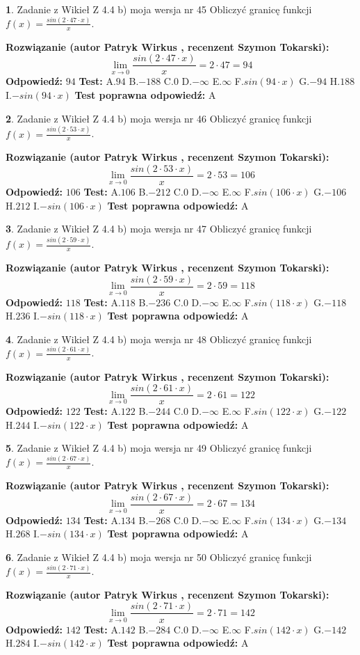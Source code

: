 \documentclass[12pt, a4paper]{article}
\theoremstyle{definition} %
\newtheorem{zad}{}
\newcommand{\zadStart}[1]{\begin{zad}#1\newline}
\newcommand{\zadStop}{\end{zad}}
\newcommand{\rozwStart}[2]{\noindent \textbf{Rozwiązanie (autor #1 , recenzent #2): }\newline}
\newcommand{\rozwStop}{\newline}
\newcommand{\odpStart}{\noindent \textbf{Odpowiedź:}\newline}
\newcommand{\odpStop}{\newline}
\newcommand{\testStart}{\noindent \textbf{Test:}\newline}
\newcommand{\testStop}{\newline}
\newcommand{\kluczStart}{\noindent \textbf{Test poprawna odpowiedź:}\newline}
\newcommand{\kluczStop}{\newline}
\begin{document}
\zadStart{Zadanie z Wikieł Z 4.4 b) moja wersja nr 45}
Obliczyć granicę funkcji $f(x)=\frac{sin(2 \cdot47\cdot x)}{x}$.
\zadStop
\rozwStart{Patryk Wirkus}{Szymon Tokarski}
$$\lim\limits_{x\to 0}\frac{sin(2 \cdot 47\cdot x)}{x}=
2 \cdot 47 = 94$$
\rozwStop
\odpStart
$94$
\odpStop
\testStart
A.$94$
B.$-188$
C.$0$
D.$-\infty$
E.$\infty$
F.$sin(94\cdot x)$
G.$-94$
H.$188$
I.$-sin(94\cdot x)$
\testStop
\kluczStart
A
\kluczStop



\zadStart{Zadanie z Wikieł Z 4.4 b) moja wersja nr 46}
Obliczyć granicę funkcji $f(x)=\frac{sin(2 \cdot53\cdot x)}{x}$.
\zadStop
\rozwStart{Patryk Wirkus}{Szymon Tokarski}
$$\lim\limits_{x\to 0}\frac{sin(2 \cdot 53\cdot x)}{x}=
2 \cdot 53 = 106$$
\rozwStop
\odpStart
$106$
\odpStop
\testStart
A.$106$
B.$-212$
C.$0$
D.$-\infty$
E.$\infty$
F.$sin(106\cdot x)$
G.$-106$
H.$212$
I.$-sin(106\cdot x)$
\testStop
\kluczStart
A
\kluczStop



\zadStart{Zadanie z Wikieł Z 4.4 b) moja wersja nr 47}
Obliczyć granicę funkcji $f(x)=\frac{sin(2 \cdot59\cdot x)}{x}$.
\zadStop
\rozwStart{Patryk Wirkus}{Szymon Tokarski}
$$\lim\limits_{x\to 0}\frac{sin(2 \cdot 59\cdot x)}{x}=
2 \cdot 59 = 118$$
\rozwStop
\odpStart
$118$
\odpStop
\testStart
A.$118$
B.$-236$
C.$0$
D.$-\infty$
E.$\infty$
F.$sin(118\cdot x)$
G.$-118$
H.$236$
I.$-sin(118\cdot x)$
\testStop
\kluczStart
A
\kluczStop



\zadStart{Zadanie z Wikieł Z 4.4 b) moja wersja nr 48}
Obliczyć granicę funkcji $f(x)=\frac{sin(2 \cdot61\cdot x)}{x}$.
\zadStop
\rozwStart{Patryk Wirkus}{Szymon Tokarski}
$$\lim\limits_{x\to 0}\frac{sin(2 \cdot 61\cdot x)}{x}=
2 \cdot 61 = 122$$
\rozwStop
\odpStart
$122$
\odpStop
\testStart
A.$122$
B.$-244$
C.$0$
D.$-\infty$
E.$\infty$
F.$sin(122\cdot x)$
G.$-122$
H.$244$
I.$-sin(122\cdot x)$
\testStop
\kluczStart
A
\kluczStop



\zadStart{Zadanie z Wikieł Z 4.4 b) moja wersja nr 49}
Obliczyć granicę funkcji $f(x)=\frac{sin(2 \cdot67\cdot x)}{x}$.
\zadStop
\rozwStart{Patryk Wirkus}{Szymon Tokarski}
$$\lim\limits_{x\to 0}\frac{sin(2 \cdot 67\cdot x)}{x}=
2 \cdot 67 = 134$$
\rozwStop
\odpStart
$134$
\odpStop
\testStart
A.$134$
B.$-268$
C.$0$
D.$-\infty$
E.$\infty$
F.$sin(134\cdot x)$
G.$-134$
H.$268$
I.$-sin(134\cdot x)$
\testStop
\kluczStart
A
\kluczStop



\zadStart{Zadanie z Wikieł Z 4.4 b) moja wersja nr 50}
Obliczyć granicę funkcji $f(x)=\frac{sin(2 \cdot71\cdot x)}{x}$.
\zadStop
\rozwStart{Patryk Wirkus}{Szymon Tokarski}
$$\lim\limits_{x\to 0}\frac{sin(2 \cdot 71\cdot x)}{x}=
2 \cdot 71 = 142$$
\rozwStop
\odpStart
$142$
\odpStop
\testStart
A.$142$
B.$-284$
C.$0$
D.$-\infty$
E.$\infty$
F.$sin(142\cdot x)$
G.$-142$
H.$284$
I.$-sin(142\cdot x)$
\testStop
\kluczStart
A
\kluczStop
\end{document}
